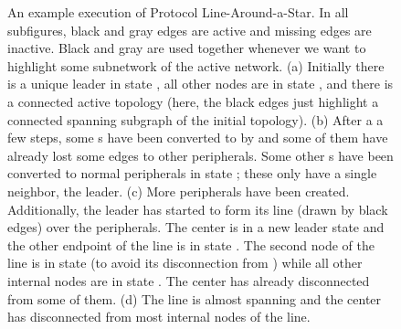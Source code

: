 \documentclass[preprint]{elsarticle}
\begin{document}
\begin{figure}[!hbtp]
   \caption{An example execution of Protocol Line-Around-a-Star. In all subfigures, black and gray edges are active and missing edges are inactive. Black and gray are used together whenever we want to highlight some subnetwork of the active network. (a) Initially there is a unique leader in state , all other nodes are in state , and there is a connected active topology (here, the black edges just highlight a connected spanning subgraph of the initial topology). (b) After a a few steps, some s have been converted to  by  and some of them have already lost some edges to other peripherals. Some other s have been converted to normal peripherals in state ; these only have a single neighbor, the leader. (c) More peripherals have been created. Additionally, the leader has started to form its line (drawn by black edges) over the peripherals. The center is in a new leader state  and the other endpoint of the line is in state . The second node of the line is in state  (to avoid its disconnection from ) while all other internal nodes are in state . The center has already disconnected from some of them. (d) The line is almost spanning and the center has disconnected from most internal nodes of the line.} \label{fig:around-a-star}
\end{figure}
\end{document}
